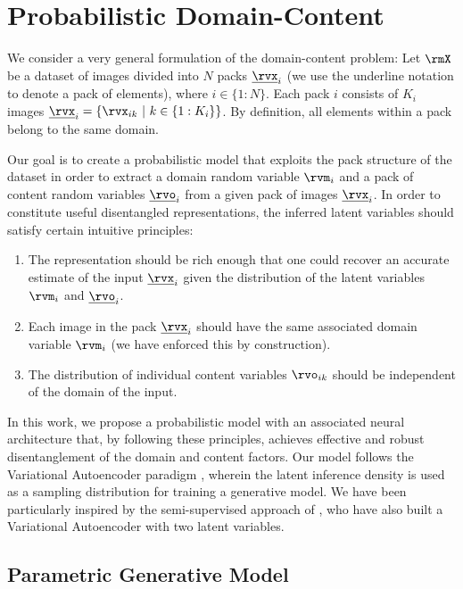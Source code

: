 \documentclass{article} %
\begin{document}
\section{Probabilistic Domain-Content}


We consider a very general formulation of the domain-content problem: Let $\rmX$ be a dataset of images divided into $N$ packs $\underline{\rvx}_i$ (we use the underline notation to denote a pack of elements), where $i \in \{1:N\}$. Each pack $i$ consists of $K_i$ images $\underline{\rvx}_i = \{\rvx_{ik} ~|~ k \in \{1:K_i\}\}$. By definition, all elements within a pack belong to the same domain.

Our goal is to create a probabilistic model that exploits the pack structure of the dataset in order to extract a domain random variable $\rvm_i$ and a pack of content random variables $\underline{\rvo}_i$ from a given pack of images $\underline{\rvx}_i$. In order to constitute useful disentangled representations, the inferred latent variables should satisfy certain intuitive principles:

\begin{enumerate}
\item The representation should be rich enough that one could recover an accurate estimate of the input $\underline{\rvx}_i$ given the distribution of the latent variables $\rvm_i$ and $\underline{\rvo}_i$. \label{princ:rec}
\item Each image in the pack $\underline{\rvx}_i$ should have the same associated domain variable $\rvm_i$ (we have enforced this by construction). \label{princ:dom}
\item The distribution of individual content variables $\rvo_{ik}$ should be independent of the domain of the input. \label{princ:con}
\end{enumerate}

In this work, we propose a probabilistic model with an associated neural architecture that, by following these principles, achieves effective and robust disentanglement of the domain and content factors. Our model follows the Variational Autoencoder paradigm \citep{kingma2013auto,rezende2014stochastic}, wherein the latent inference density is used as a sampling distribution for training a generative model. We have been particularly inspired by the semi-supervised approach of \citet{kingma2014semi}, who have also built a Variational Autoencoder with two latent variables.

\subsection{Parametric Generative Model}
\end{document}

